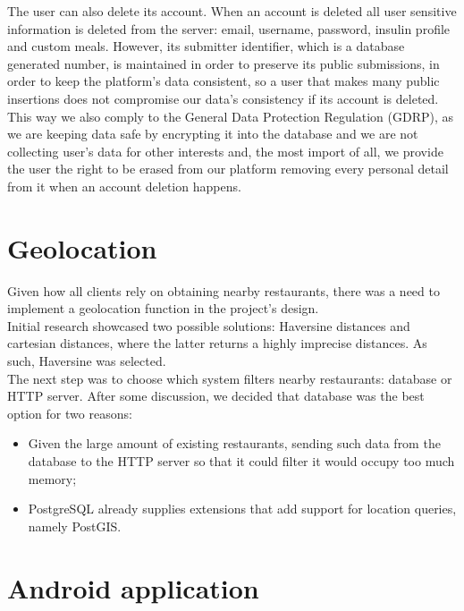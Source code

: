 The user can also delete its account. When an account is deleted all user sensitive information is deleted from the server: email,
username, password, insulin profile and custom meals. However, its submitter identifier, which is a database generated number,
is maintained in order to preserve its public submissions, in order to keep the platform's data consistent, so a user that makes many 
public insertions does not compromise our data's consistency if its account is deleted.\\

This way we also comply to the General Data Protection Regulation (GDRP)\cite{gdpr}, as we are keeping data safe by encrypting it into the database and
we are not collecting user's data for other interests and, the most import of all, we provide the user the right to be erased from our 
platform removing every personal detail from it when an account deletion happens.\\

\section{Geolocation}

Given how all clients rely on obtaining nearby restaurants, there was a need to implement a geolocation function in the project's design.\\

Initial research showcased two possible solutions: Haversine\cite{haversine} distances and cartesian distances, where the latter returns a highly imprecise distances.
As such, Haversine was selected.\\

The next step was to choose which system filters nearby restaurants: database or HTTP server. After some discussion, we decided that database was the best
option for two reasons: 
\begin{itemize}
    \item Given the large amount of existing restaurants, sending such data from the database to the HTTP server so that it could filter it would occupy too much memory;
    \item PostgreSQL already supplies extensions that add support for location queries, namely PostGIS.
\end{itemize}

\section{Android application}

